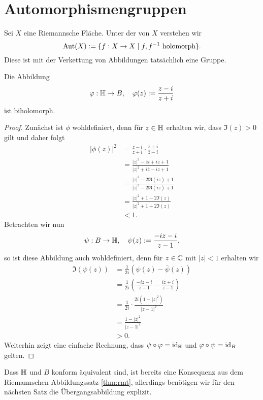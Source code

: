 
\section{Automorphismengruppen}
\label{sec:auto}

\begin{defin}
  Sei $X$ eine Riemannsche Fläche. Unter der
   von $X$ verstehen wir
  \[
  \operatorname{Aut}(X) := \{ f: X \rightarrow X \mid f,f^{-1} \text{ holomorph} \}.
  \]
  Diese ist mit der Verkettung von Abbildungen tatsächlich eine Gruppe.
\end{defin}

\begin{lemma}
  \label{lemma:kreis-halbebene}
  Die Abbildung
  \[
  \varphi: \mathbb{H} \rightarrow B, \quad \varphi(z) := \frac{z-i}{z+i}
  \]
  ist biholomorph.
\end{lemma}

\begin{proof}
  Zunächst ist $\phi$ wohldefiniert, denn für $z \in \mathbb{H}$ erhalten wir,
  dass $\Im(z) > 0$ gilt und daher folgt
  \begin{align*}
    |\phi(z)|^2 & = \frac{z-i}{z+i} \cdot \frac{\bar z + i}{\bar z -
      i} \\
    & = \frac{|z|^2 - \bar z i + i z + 1}{|z|^2 +i \bar z - i z + 1}
    \\
    & = \frac{|z|^2 - 2 \Re(iz) + 1}{|z|^2 - 2 \Re(iz) + 1} \\
    & = \frac{|z|^2 +1 - 2 \Im(z)}{|z|^2 + 1 + 2\Im(z)} \\
    & < 1.
  \end{align*}
  Betrachten wir nun
  \[
  \psi: B \rightarrow \mathbb{H}, \quad \psi(z) := \frac{ -iz - i}{z-1},
  \]
  so ist diese Abbildung auch wohldefiniert, denn für $z \in \mathbb{C}$ mit
  $|z| < 1$ erhalten wir
  \begin{align*}
    \Im(\psi(z)) & = \frac{1}{2i} ( \psi(z) - \bar \psi(z)) \\
    & = \frac{1}{2i} \left ( \frac{-iz - i}{z -1 } - \frac{ i \bar z +
        i}{\bar z - 1} \right ) \\
    & = \frac{1}{2i} \cdot \frac{2i ( 1- |z|^2 )}{|z -1|^2} \\
    & = \frac{1- |z|^2}{|z-1|^2} \\
    & > 0.
  \end{align*}
  Weiterhin zeigt eine einfache Rechnung, dass $\psi \circ \varphi =
  \operatorname{id}_{\mathbb{H}}$ und $\varphi \circ \psi = \operatorname{id}_B$ gelten.
\end{proof}

\begin{rem}
  Dass $\mathbb{H}$ und $B$ konform äquivalent sind, ist bereits eine
  Konsequenz aus dem Riemannschen Abbildungssatz \ref{thm:rmt}, allerdings benötigen
  wir für den nächsten Satz die Übergangsabbildung explizit.
\end{rem}

